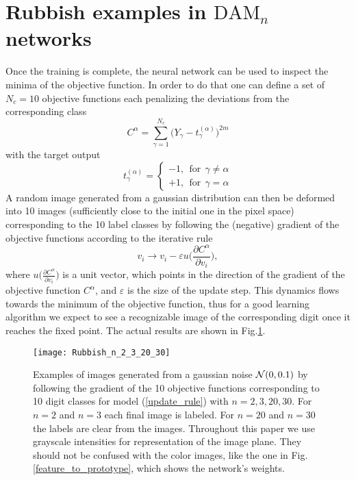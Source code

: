 \documentclass[12pt]{article} %
\begin{document}
\section{Rubbish examples in $\text{DAM}_n$ networks}  
Once the training is complete, the neural network can be used to inspect the minima of the objective function. In order to do that one can define a set of $N_c=10$ objective functions each penalizing the deviations from the corresponding class
\begin{equation}
C^\alpha=\sum\limits_{\gamma=1}^{N_c} \Big(Y_\gamma - t_\gamma^{(\alpha)}\Big)^{2m}
\end{equation}
with the target output 
$$
t_\gamma^{(\alpha)}=\begin{cases} -1, \ \ \text{for}\ \  \gamma \neq \alpha\\
+1,  \ \ \text{for}\ \  \gamma=\alpha
\end{cases}
$$
A random image generated from a gaussian distribution can then be deformed into 10 images (sufficiently close to the initial one in the pixel space) corresponding to the 10 label classes by following the (negative) gradient of the objective functions according to the iterative rule 
\begin{equation}\label{gradient rule}
v_i \rightarrow v_i - \varepsilon u\Big( \frac{\partial C^\alpha}{\partial v_i}\Big),
\end{equation}
where $u\Big( \frac{\partial C^\alpha}{\partial v_i}\Big)$ is a unit vector, which points in the direction of the gradient of the objective function $C^\alpha$, and $\varepsilon$ is the size of the update step. This dynamics flows towards the minimum of the objective function, thus for a good learning algorithm we expect to see a recognizable image of the corresponding digit once it reaches the fixed point. The actual results are shown in Fig.\ref{irreg_images}. 
\begin{figure}[h]
\begin{center}
\texttt{[image: Rubbish\_n\_2\_3\_20\_30]}
\end{center}
\caption{\footnotesize{Examples of images generated from a gaussian noise ${\cal N} (0,0.1)$ by following the gradient of the 10 objective functions corresponding to 10 digit classes for model (\ref{update_rule}) with $n=2,3,20,30$. For $n=2$ and $n=3$ each final image is labeled. For $n=20$ and $n=30$ the labels are clear from the images. Throughout this paper we use grayscale intensities for representation of the image plane. They should not be confused with the color images, like the one in Fig.\ref{feature_to_prototype}, which shows the network's weights.}}\label{irreg_images}
\end{figure}
\end{document}

